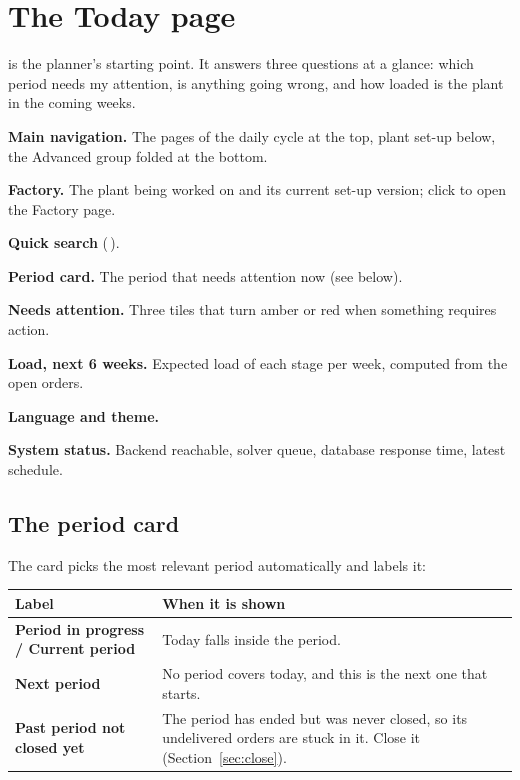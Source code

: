 \chapter{The Today page}\label{ch:today}

 is the planner's starting point. It answers three questions at a glance: which period needs my
attention, is anything going wrong, and how loaded is the plant in the coming weeks.


\begin{callouts}
  \item[1] \textbf{Main navigation.} The pages of the daily cycle at the top, plant set-up below, the
           Advanced group folded at the bottom.
  \item[2] \textbf{Factory.} The plant being worked on and its current set-up version; click to open the
           Factory page.
  \item[3] \textbf{Quick search} (\,).
  \item[4] \textbf{Period card.} The period that needs attention now (see below).
  \item[5] \textbf{Needs attention.} Three tiles that turn amber or red when something requires action.
  \item[6] \textbf{Load, next 6 weeks.} Expected load of each stage per week, computed from the open orders.
  \item[7] \textbf{Language and theme.}
  \item[8] \textbf{System status.} Backend reachable, solver queue, database response time, latest schedule.
\end{callouts}

\section{The period card}

The card picks the most relevant period automatically and labels it:

\begin{center}
\begin{tabularx}{\linewidth}{>{\bfseries}p{4.2cm}X}
\toprule
\rowcolor{white}Label & When it is shown \\
\midrule
Period in progress / Current period & Today falls inside the period. \\
Next period & No period covers today, and this is the next one that starts. \\
Past period not closed yet & The period has ended but was never closed, so its undelivered orders are stuck in it. Close it (Section~\ref{sec:close}). \\
\bottomrule
\end{tabularx}
\end{center}


